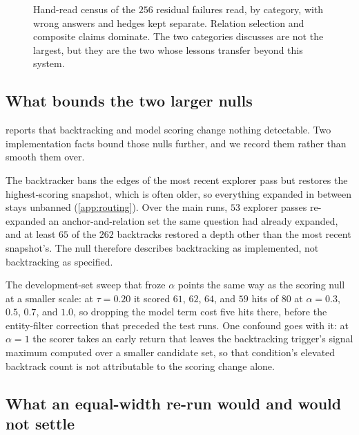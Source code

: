 \begin{figure}[!tb]
  \begin{center}
    
  \end{center}
  \caption{Hand-read census of the $256$ residual failures read, by
    category, with wrong answers and hedges kept separate. Relation
    selection and composite claims dominate. The two categories
     discusses are not the largest, but they
    are the two whose lessons transfer beyond this system.}
  \label{fig:failures}
\end{figure}

\subsection{What bounds the two larger nulls}\label{app:nulldetail}

 reports that backtracking and model scoring change
nothing detectable. Two implementation facts bound those nulls further,
and we record them rather than smooth them over.

The backtracker bans the edges of the most recent explorer pass but
restores the highest-scoring snapshot, which is often older, so
everything expanded in between stays unbanned (\ref{app:routing}). Over
the main runs, $53$ explorer passes re-expanded an anchor-and-relation
set the same question had already expanded, and at least $65$ of the
$262$ backtracks restored a depth other than the most recent snapshot's.
The null therefore describes backtracking as implemented, not
backtracking as specified.

The development-set sweep that froze $\alpha$ points the same way as the
scoring null at a smaller scale: at $\tau = 0.20$ it scored $61$, $62$,
$64$, and $59$ hits of $80$ at $\alpha = 0.3$, $0.5$, $0.7$, and $1.0$,
so dropping the model term cost five hits there, before the
entity-filter correction that preceded the test runs. One confound goes
with it: at $\alpha = 1$ the scorer takes an early return that leaves
the backtracking trigger's signal maximum computed over a smaller
candidate set, so that condition's elevated backtrack count is not
attributable to the scoring change alone.

\subsection{What an equal-width re-run would and would not
  settle}\label{app:equalwidth}

